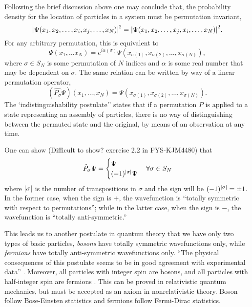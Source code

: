         Following the brief discussion above one may conclude that, the probability density
        for the location of particles in a system must be permutation invariant,
        \begin{equation}
            \label{eq:square_wavefunction_pauli}
            \abs{\Psi(x_1, x_2, \dots, x_i, x_j, \dots, x_N)}^2 
            = 
            \abs{\Psi(x_1, x_2, \dots, x_j, x_i, \dots, x_N)}^2.
        \end{equation}
        For any arbitrary permutation, this is equivalent to 
        \begin{equation}
            \Psi(x_1, \dots x_N) 
            =
            e^{i\alpha(\sigma)}\Psi(x_{\sigma(1)}, x_{\sigma(2)}, \dots, x_{\sigma(N)}),
        \end{equation}
        where $\sigma \in S_N$ is some permutation of $N$ indices and $\alpha$ is 
        some real number that may be dependent on $\sigma$.
        The same relation can be written by way of a linear permutation operator,
        \begin{equation}
            (\hat{P_\sigma}\Psi)(x_1, \dots, x_N)
            =
            \Psi(x_{\sigma(1)}, x_{\sigma(2)}, \dots, x_{\sigma(N)}).
        \end{equation}
        The `indistinguishability postulate'' states that if a permutation $P$ is applied 
        to a state representing an assembly of particles, there is no way of distinguishing
        between the permuted state and the original, by means of an observation at any time.
   
        One can show (Difficult to show? exercise 2.2 in FYS-KJM4480) that 
        \begin{equation}
            \hat{P}_\sigma\Psi = 
            \begin{cases}
                \Psi &\\
                (-1)^{\abs{\sigma}}\Psi& 
            \end{cases} \forall \sigma \in S_N
        \end{equation}
        where $\abs{\sigma}$ is the number of transpositions in $\sigma$ and the sign 
        will be $(-1)^{\abs{\sigma}} = \pm 1$. In the former case, when the sign is $+$,
        the wavefunction is ``totally symmetric with respect to permutations''; while in 
        the latter case, when the sign is $-$, the wavefunction is ``totally anti-symmetric.''

        This leads us to another postulate in quantum theory that we have only two types of 
        basic particles, \emph{bosons} have totally symmetric wavefunctions only, while 
        \emph{fermions} have totally anti-symmetric wavefunctions only. ``The physical 
        consequences of this postulate seems to be in good agreement with experimental data''
        \cite{leinaas1977theory}. Moreover, all particles with integer spin are bosons, 
        and all particles with half-integer spin are fermions
        \cite{fierz1939relativistische,pauli1940connection}. This can be proved in relativistic
        quantum mechanics, but must be accepted as an axiom in nonrelativistic 
        theory\cite{hilborn1995atoms}. Boson follow Bose-Einsten statistics and fermions
        follow Fermi-Dirac statistics.

